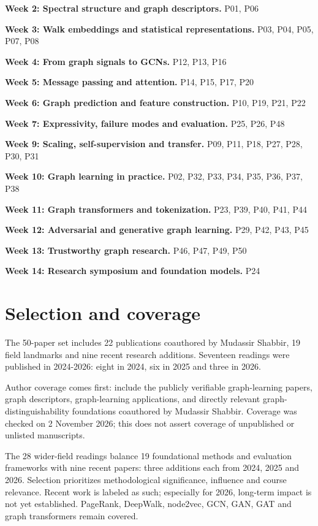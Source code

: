 \documentclass[11pt,letterpaper]{article}
\begin{document}
\textbf{Week 2: Spectral structure and graph descriptors.} P01, P06\par
\textbf{Week 3: Walk embeddings and statistical representations.} P03, P04, P05, P07, P08\par
\textbf{Week 4: From graph signals to GCNs.} P12, P13, P16\par
\textbf{Week 5: Message passing and attention.} P14, P15, P17, P20\par
\textbf{Week 6: Graph prediction and feature construction.} P10, P19, P21, P22\par
\textbf{Week 7: Expressivity, failure modes and evaluation.} P25, P26, P48\par
\textbf{Week 9: Scaling, self-supervision and transfer.} P09, P11, P18, P27, P28, P30, P31\par
\textbf{Week 10: Graph learning in practice.} P02, P32, P33, P34, P35, P36, P37, P38\par
\textbf{Week 11: Graph transformers and tokenization.} P23, P39, P40, P41, P44\par
\textbf{Week 12: Adversarial and generative graph learning.} P29, P42, P43, P45\par
\textbf{Week 13: Trustworthy graph research.} P46, P47, P49, P50\par
\textbf{Week 14: Research symposium and foundation models.} P24\par
\clearpage\section*{Selection and coverage}
The 50-paper set includes 22 publications coauthored by Mudassir Shabbir, 19 field landmarks and nine recent research additions. Seventeen readings were published in 2024-2026: eight in 2024, six in 2025 and three in 2026.\par
Author coverage comes first: include the publicly verifiable graph-learning papers, graph descriptors, graph-learning applications, and directly relevant graph-distinguishability foundations coauthored by Mudassir Shabbir. Coverage was checked on 2 November 2026; this does not assert coverage of unpublished or unlisted manuscripts.\par
The 28 wider-field readings balance 19 foundational methods and evaluation frameworks with nine recent papers: three additions each from 2024, 2025 and 2026. Selection prioritizes methodological significance, influence and course relevance. Recent work is labeled as such; especially for 2026, long-term impact is not yet established. PageRank, DeepWalk, node2vec, GCN, GAN, GAT and graph transformers remain covered.\par
\end{document}
